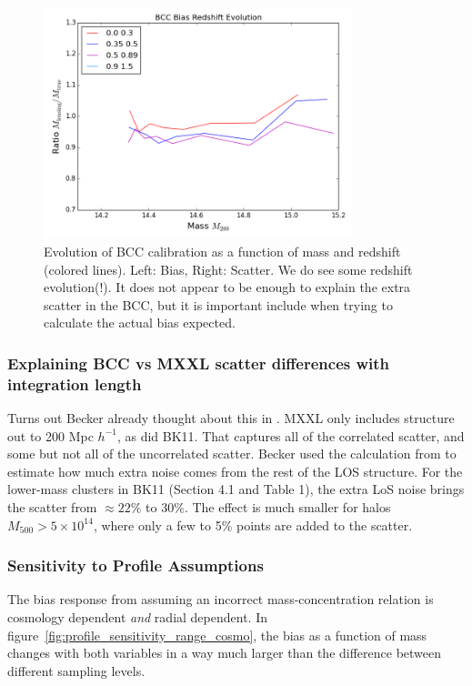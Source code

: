 \documentclass[11pt]{article}
\begin{document}
\begin{figure} \centering
\includegraphics[width=0.8\textwidth]{figures/bcc_bias_redshift_evo_r10_n0_0}
\caption{Evolution of BCC calibration as a function of mass and redshift (colored lines). Left: Bias, Right: Scatter. We do see some redshift evolution(!). It does not appear to be enough to explain the extra scatter in the BCC, but it is important include when trying to calculate the actual bias expected.}
\label{fig:bcc_bias_redshift_evo}
\end{figure}

\subsubsection{Explaining BCC vs MXXL scatter differences with integration length}

Turns out Becker already thought about this in \citet{becker11}. MXXL only includes structure out to 200 Mpc $h^{-1}$, as did BK11. That captures all of the correlated scatter, and some but not all of the uncorrelated scatter. Becker used the calculation from \citet{hoekstra2003} to estimate how much extra noise comes from the rest of the LOS structure. For the lower-mass clusters in BK11 (Section 4.1 and Table 1), the extra LoS noise brings the scatter from $\approx22\%$ to $30\%$. The effect is much smaller for halos $M_{500} > 5\times10^{14}$, where only a few to 5\% points are added to the scatter.



\subsubsection{Sensitivity to Profile Assumptions}

The bias response from assuming an incorrect mass-concentration relation is cosmology dependent \emph{and} radial dependent. In figure~\ref{fig:profile_sensitivity_range_cosmo}, the bias as a function of mass changes with both variables in a way much larger than the difference between different sampling levels.
\end{document}
